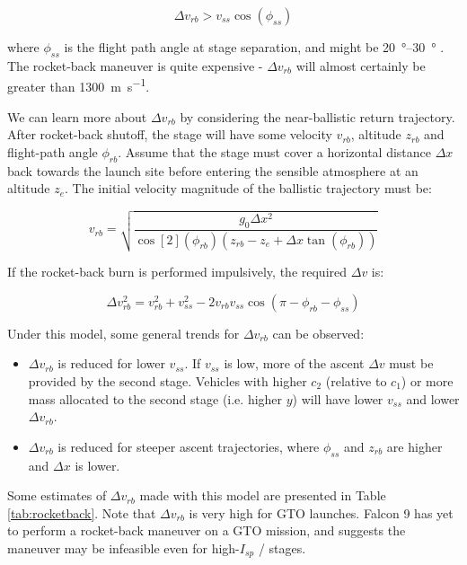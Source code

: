 \documentclass[conf]{new-aiaa}
\begin{document}
\begin{equation}
\Delta v_{rb} > v_{ss} \cos(\phi_{ss})
\end{equation}

where $\phi_{ss}$ is the flight path angle at stage separation, and might be \SIrange{20}{30}{\degree} \cite{McKinney1986}. The rocket-back maneuver is quite expensive - $\Delta v_{rb}$ will almost certainly be greater than \SI{1300}{\meter\per\second}.

We can learn more about $\Delta v_{rb}$ by considering the near-ballistic return trajectory. After rocket-back shutoff, the stage will have some velocity $v_{rb}$, altitude $z_{rb}$ and flight-path angle $\phi_{rb}$. Assume that the stage must cover a horizontal distance $\Delta x$ back towards the launch site before entering the sensible atmosphere at an altitude $z_e$. The initial velocity magnitude of the ballistic trajectory must be:

\begin{equation}
\label{eq:rocketback_velocity}
v_{rb} = \sqrt{\frac{g_0 \Delta x^2}{\cos[2](\phi_{rb})(z_{rb} - z_{e} + \Delta x \tan(\phi_{rb}))} }
\end{equation}

If the rocket-back burn is performed impulsively, the required $\Delta v$ is:

\begin{equation}
\label{eq:rocketback_dv}
\Delta v_{rb}^2 = v_{rb}^2 + v_{ss}^2 - 2 v_{rb} v_{ss} \cos(\pi - \phi_{rb} - \phi_{ss})
\end{equation}

Under this model, some general trends for $\Delta v_{rb}$ can be observed:
\begin{itemize}
	\item $\Delta v_{rb}$ is reduced for lower $v_{ss}$. If $v_{ss}$ is low, more of the ascent $\Delta v$ must be provided by the second stage. Vehicles with higher $c_2$ (relative to $c_1$) or more mass allocated to the second stage (i.e. higher $y$) will have lower $v_{ss}$ and lower $\Delta v_{rb}$.
	\item $\Delta v_{rb}$ is reduced for steeper ascent trajectories, where $\phi_{ss}$ and $z_{rb}$ are higher and $\Delta x$ is lower.
\end{itemize}

Some estimates of $\Delta v_{rb}$ made with this model are presented in Table \ref{tab:rocketback}. Note that $\Delta v_{rb}$ is very high for GTO launches. Falcon 9 has yet to perform a rocket-back maneuver on a GTO mission, and \cite{Dumont2017} suggests the maneuver may be infeasible even for high-$I_{sp}$ / stages.
\end{document}
